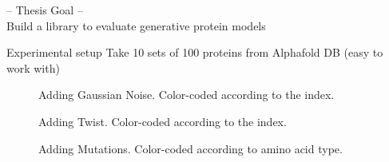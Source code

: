 \documentclass[aspectratio=169, 10pt, dvipsnames]{beamer}
\begin{document}
\begin{frame}[standout]
  -- Thesis Goal -- \\
  Build a library to evaluate generative protein models
\end{frame}

{
\begin{frame}[fragile]{Experimental setup}
  Take 10 sets of 100 proteins from Alphafold DB (easy to work with)
  \begin{minipage}{0.3\textwidth}
    \begin{figure}
      \centering
      \caption{Adding Gaussian Noise. Color-coded according to the index.}
      \label{fig:gaussian}
    \end{figure}
  \end{minipage}
  \hfill
  \begin{minipage}{0.3\textwidth}
    \begin{figure}
      \centering
      \caption{Adding Twist. Color-coded according to the index.}
      \label{fig:twist}
    \end{figure}
  \end{minipage}
  \hfill
  \begin{minipage}{0.3\textwidth}
    \begin{figure}
      \centering
      \caption{Adding Mutations. Color-coded according to amino acid type.}
      \label{fig:mutation}
    \end{figure}
  \end{minipage}
\end{frame}
}
\end{document}
